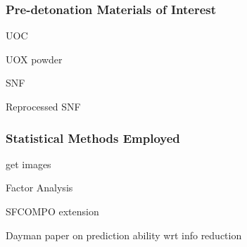 
\begin{frame}
  \frametitle{Pre-detonation Materials of Interest}
  UOC

  UOX powder

  SNF

  Reprocessed SNF
\end{frame}

\begin{frame}
  \frametitle{Statistical Methods Employed}
  get images 

  Factor Analysis

  SFCOMPO extension

  Dayman paper on prediction ability wrt info reduction
\end{frame}

